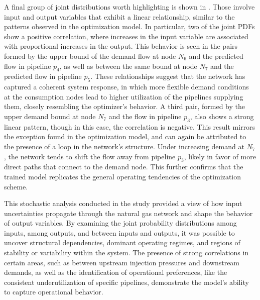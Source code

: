 A final group of joint distributions worth highlighting is shown in . Those involve input and output variables that exhibit a linear relationship, similar to the patterns observed in the optimization model. In particular, two of the joint PDFs show a positive correlation, where increases in the input variable are associated with proportional increases in the output. This behavior is seen in the pairs formed by the upper bound of the demand flow at node $N_6$ and the predicted flow in pipeline $p_4$, as well as between the same bound at node $N_7$ and the predicted flow in pipeline $p_5$. These relationships suggest that the network has captured a coherent system response, in which more flexible demand conditions at the consumption nodes lead to higher utilization of the pipelines supplying them, closely resembling the optimizer’s behavior. A third pair, formed by the upper demand bound at node $N_7$ and the flow in pipeline $p_3$, also shows a strong linear pattern, though in this case, the correlation is negative. This result mirrors the exception found in the optimization model, and can again be attributed to the presence of a loop in the network’s structure. Under increasing demand at $N_7$, the network tends to shift the flow away from pipeline $p_3$, likely in favor of more direct paths that connect to the demand node. This further confirms that the trained model replicates the general operating tendencies of the optimization scheme.



This stochastic analysis conducted in the study provided a view of how input uncertainties propagate through the natural gas network and shape the behavior of output variables. By examining the joint probability distributions among inputs, among outputs, and between inputs and outputs, it was possible to uncover structural dependencies, dominant operating regimes, and regions of stability or variability within the system. The presence of strong correlations in certain areas, such as between upstream injection pressures and downstream demands, as well as the identification of operational preferences, like the consistent underutilization of specific pipelines, demonstrate the model’s ability to capture operational behavior. 


